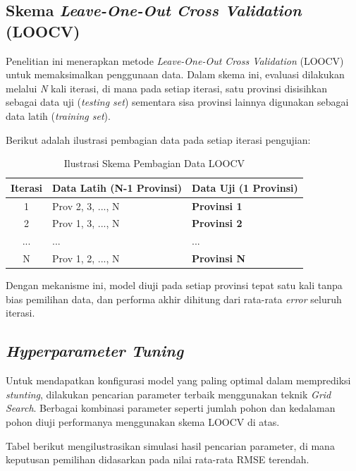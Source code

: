 \subsection{Skema \textit{Leave-One-Out Cross Validation} (LOOCV)}

Penelitian ini menerapkan metode \textit{Leave-One-Out Cross Validation} (LOOCV) untuk memaksimalkan penggunaan data. Dalam skema ini, evaluasi dilakukan melalui \textit{N} kali iterasi, di mana pada setiap iterasi, satu provinsi disisihkan sebagai data uji (\textit{testing set}) sementara sisa provinsi lainnya digunakan sebagai data latih (\textit{training set}).

Berikut adalah ilustrasi pembagian data pada setiap iterasi pengujian:

\begin{table}[H]
    \centering
    \renewcommand{\arraystretch}{1.3}
    \caption{Ilustrasi Skema Pembagian Data LOOCV}
    \label{tab:loocv_scheme_dummy}
    \begin{tabular}{cll}
    \toprule
    \textbf{Iterasi} & \textbf{Data Latih (N-1 Provinsi)} & \textbf{Data Uji (1 Provinsi)} \\
    \midrule
    1 & Prov 2, 3, ..., N & \textbf{Provinsi 1} \\
    2 & Prov 1, 3, ..., N & \textbf{Provinsi 2} \\
    ... & ... & ... \\
    N & Prov 1, 2, ..., N & \textbf{Provinsi N} \\
    \bottomrule
    \end{tabular}
\end{table}

Dengan mekanisme ini, model diuji pada setiap provinsi tepat satu kali tanpa bias pemilihan data, dan performa akhir dihitung dari rata-rata \textit{error} seluruh iterasi.

\subsection{\textit{Hyperparameter Tuning}}

Untuk mendapatkan konfigurasi model yang paling optimal dalam memprediksi \textit{stunting}, dilakukan pencarian parameter terbaik menggunakan teknik \textit{Grid Search}. Berbagai kombinasi parameter seperti jumlah pohon dan kedalaman pohon diuji performanya menggunakan skema LOOCV di atas.

Tabel berikut mengilustrasikan simulasi hasil pencarian parameter, di mana keputusan pemilihan didasarkan pada nilai rata-rata RMSE terendah.

